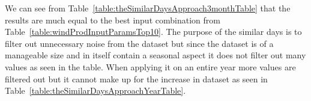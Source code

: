 We can see from Table~\ref{table:theSimilarDaysApproach3monthTable} that the results are much equal to the best input combination from Table~\ref{table:windProdInputParamsTop10}. The purpose of the similar days is to filter out unnecessary noise from the dataset but since the dataset is of a manageable size and in itself contain a seasonal aspect it does not filter out many values as seen in the table. When applying it on an entire year more values are filtered out but it cannot make up for the increase in dataset as seen in Table~\ref{table:theSimilarDaysApproachYearTable}.